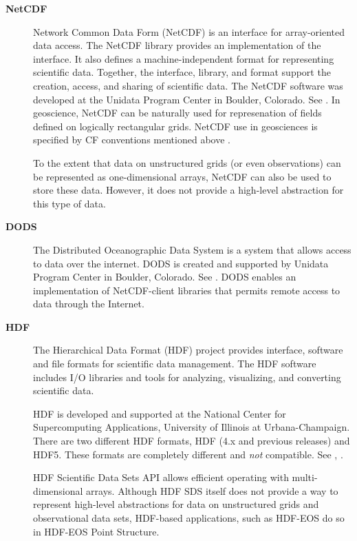 \begin{description}
\item[\bf NetCDF] Network Common Data Form (NetCDF) is an interface for 
array-oriented data access. The NetCDF library provides an
implementation of the interface. It also defines a 
machine-independent format for representing scientific data. Together,
the interface, library, and format support the creation, access, and
sharing of scientific data. The NetCDF software was developed at the
Unidata Program Center in Boulder, Colorado. See \cite{NetCDF3_UsersGuide_C}.
In geoscience, NetCDF can be naturally used for represenation of fields 
defined on logically rectangular grids. NetCDF use in geosciences is 
specified by CF conventions mentioned above \cite{NetCDF_CF_v1_beta3}. 

To the extent that data on unstructured grids (or even observations) can be 
represented as one-dimensional arrays, NetCDF can also be used to store these 
data. However, it does not provide a high-level abstraction for this type of 
data. 

\item[\bf DODS] The Distributed Oceanographic Data System is a system that 
allows access to data over the internet. DODS is created and supported by 
Unidata Program Center in Boulder, Colorado. See \cite{DODS}. DODS enables an 
implementation of NetCDF-client libraries that permits remote access to data 
through the Internet.


\item[\bf HDF] The Hierarchical Data Format (HDF) project provides
interface,  software and file formats for scientific data management. 
The HDF software includes I/O libraries and tools for analyzing,
visualizing, and converting scientific data. 

HDF is developed and supported at the National Center for Supercomputing 
Applications, University of Illinois at Urbana-Champaign. There are two 
different HDF formats, HDF (4.x and previous releases) and HDF5. These 
formats are completely different and {\it not} compatible.  See
\cite{HDF4_tutorials}, \cite{HDF5_tutorial}.

HDF Scientific Data Sets API allows efficient operating with
multi-dimensional arrays. Although HDF SDS itself does not provide a way
to represent high-level abstractions for data on unstructured grids
and observational data sets, HDF-based applications, such as HDF-EOS
do so in HDF-EOS Point Structure.





\end{description}

